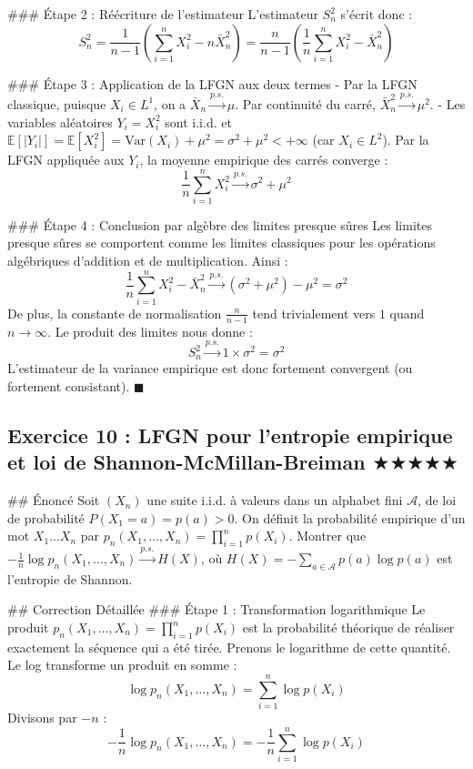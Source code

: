 \documentclass[11pt,a4paper]{article}
\begin{document}
\#\#\# Étape 2 : Réécriture de l'estimateur
L'estimateur $S_n^2$ s'écrit donc :
$$ S_n^2 = \frac{1}{n-1} \left( \sum_{i=1}^n X_i^2 - n \bar{X}_n^2 \right) = \frac{n}{n-1} \left( \frac{1}{n}\sum_{i=1}^n X_i^2 - \bar{X}_n^2 \right) $$

\#\#\# Étape 3 : Application de la LFGN aux deux termes
- Par la LFGN classique, puisque $X_i \in L^1$, on a $\bar{X}_n \xrightarrow{p.s.} \mu$. Par continuité du carré, $\bar{X}_n^2 \xrightarrow{p.s.} \mu^2$.
- Les variables aléatoires $Y_i = X_i^2$ sont i.i.d. et $\mathbb{E}[|Y_i|] = \mathbb{E}[X_i^2] = \text{Var}(X_i) + \mu^2 = \sigma^2 + \mu^2 < +\infty$ (car $X_i \in L^2$).
Par la LFGN appliquée aux $Y_i$, la moyenne empirique des carrés converge :
$$ \frac{1}{n} \sum_{i=1}^n X_i^2 \xrightarrow{p.s.} \sigma^2 + \mu^2 $$

\#\#\# Étape 4 : Conclusion par algèbre des limites presque sûres
Les limites presque sûres se comportent comme les limites classiques pour les opérations algébriques d'addition et de multiplication.
Ainsi :
$$ \frac{1}{n}\sum_{i=1}^n X_i^2 - \bar{X}_n^2 \xrightarrow{p.s.} (\sigma^2 + \mu^2) - \mu^2 = \sigma^2 $$
De plus, la constante de normalisation $\frac{n}{n-1}$ tend trivialement vers $1$ quand $n \to \infty$.
Le produit des limites nous donne :
$$ S_n^2 \xrightarrow{p.s.} 1 \times \sigma^2 = \sigma^2 $$
L'estimateur de la variance empirique est donc fortement convergent (ou fortement consistant). $\blacksquare$


\subsection*{Exercice 10 : LFGN pour l'entropie empirique et loi de Shannon-McMillan-Breiman \quad $\bigstar\bigstar\bigstar\bigstar\bigstar$}

\#\# Énoncé
Soit $(X_n)$ une suite i.i.d. à valeurs dans un alphabet fini $\mathcal{A}$, de loi de probabilité $P(X_1 = a) = p(a) > 0$.
On définit la probabilité empirique d'un mot $X_1\dots X_n$ par $p_n(X_1, \dots, X_n) = \prod_{i=1}^n p(X_i)$.
Montrer que $-\frac{1}{n} \log p_n(X_1, \dots, X_n) \xrightarrow{p.s.} H(X)$, où $H(X) = -\sum_{a \in \mathcal{A}} p(a) \log p(a)$ est l'entropie de Shannon.

\#\# Correction Détaillée
\#\#\# Étape 1 : Transformation logarithmique
Le produit $p_n(X_1, \dots, X_n) = \prod_{i=1}^n p(X_i)$ est la probabilité théorique de réaliser exactement la séquence qui a été tirée.
Prenons le logarithme de cette quantité. Le log transforme un produit en somme :
$$ \log p_n(X_1, \dots, X_n) = \sum_{i=1}^n \log p(X_i) $$
Divisons par $-n$ :
$$ -\frac{1}{n} \log p_n(X_1, \dots, X_n) = -\frac{1}{n} \sum_{i=1}^n \log p(X_i) $$
\end{document}
